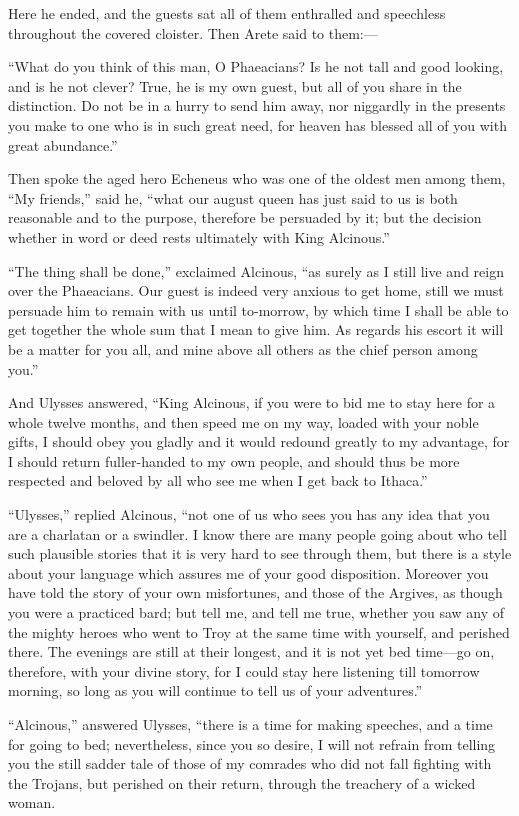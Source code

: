 Here he ended, and the guests sat all of them enthralled and speechless
throughout the covered cloister. Then Arete said to them:—

“What do you think of this man, O Phaeacians? Is he not tall and good looking,
and is he not clever? True, he is my own guest, but all of you share in the
distinction. Do not be in a hurry to send him away, nor niggardly in the
presents you make to one who is in such great need, for heaven has blessed all
of you with great abundance.”

Then spoke the aged hero Echeneus who was one of the oldest men among them, “My
friends,” said he, “what our august queen has just said to us is both
reasonable and to the purpose, therefore be persuaded by it; but the decision
whether in word or deed rests ultimately with King Alcinous.”

“The thing shall be done,” exclaimed Alcinous, “as surely as I still live and
reign over the Phaeacians. Our guest is indeed very anxious to get home, still
we must persuade him to remain with us until to-morrow, by which time I shall
be able to get together the whole sum that I mean to give him. As regards his
escort it will be a matter for you all, and mine above all others as the chief
person among you.”

And Ulysses answered, “King Alcinous, if you were to bid me to stay here for a
whole twelve months, and then speed me on my way, loaded with your noble gifts,
I should obey you gladly and it would redound greatly to my advantage, for I
should return fuller-handed to my own people, and should thus be more respected
and beloved by all who see me when I get back to Ithaca.”

“Ulysses,” replied Alcinous, “not one of us who sees you has any idea that you
are a charlatan or a swindler. I know there are many people going about who
tell such plausible stories that it is very hard to see through them, but there
is a style about your language which assures me of your good disposition.
Moreover you have told the story of your own misfortunes, and those of the
Argives, as though you were a practiced bard; but tell me, and tell me true,
whether you saw any of the mighty heroes who went to Troy at the same time with
yourself, and perished there. The evenings are still at their longest, and it
is not yet bed time—go on, therefore, with your divine story, for I could stay
here listening till tomorrow morning, so long as you will continue to tell us
of your adventures.”

“Alcinous,” answered Ulysses, “there is a time for making speeches, and a time
for going to bed; nevertheless, since you so desire, I will not refrain from
telling you the still sadder tale of those of my comrades who did not fall
fighting with the Trojans, but perished on their return, through the treachery
of a wicked woman.

